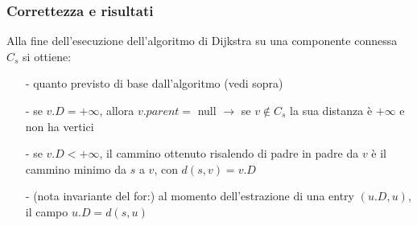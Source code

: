 \documentclass[a4paper]{article}
\begin{document}
\subsubsection*{Correttezza e risultati}
Alla fine dell'esecuzione dell'algoritmo di Dijkstra su una componente connessa \(C_s\) si ottiene:
\begin{itemize}[topsep=3pt, itemsep=0pt]
	\item[-] quanto previsto di base dall'algoritmo (vedi sopra)
	\item[-] se \(v.D = +\infty\), allora \(v.parent = \) null \(\rightarrow\) se \(v \notin C_s\) la sua distanza è \(+\infty\)
	e non ha vertici 
	\item[-] se \(v.D < +\infty\), il cammino ottenuto risalendo di padre in padre da \(v\) è il cammino minimo da \(s\) a \(v\),
	con \(d(s,v) = v.D\)
	\item[-] (nota invariante del for:) al momento dell'estrazione di una entry \((u.D, u)\), il campo \(u.D = d(s,u)\)
\end{itemize}
\end{document}
